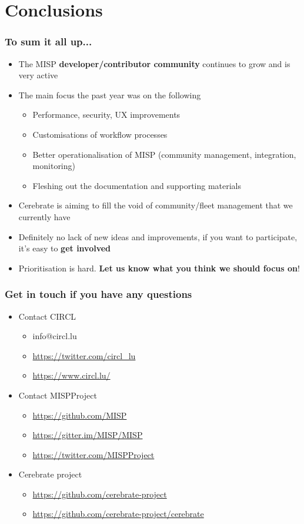 \section{Conclusions}

\begin{frame}
  \frametitle{To sum it all up...}
  \begin{itemize}
     \item The MISP {\bf developer/contributor community} continues to grow and is very active
     \item The main focus the past year was on the following
     \begin{itemize}
          \item Performance, security, UX improvements
          \item Customisations of workflow processes
          \item Better operationalisation of MISP (community management, integration, monitoring)
          \item Fleshing out the documentation and supporting materials
     \end{itemize}
     \item Cerebrate is aiming to fill the void of community/fleet management that we currently have
     \item Definitely no lack of new ideas and improvements, if you want to participate, it's easy to {\bf get involved}
     \item Prioritisation is hard. {\bf Let us know what you think we should focus on}!
  \end{itemize}
\end{frame}

\begin{frame}
  \frametitle{Get in touch if you have any questions}
  \begin{itemize}
    \item Contact CIRCL
    \begin{itemize}
      \item info@circl.lu
      \item \url{https://twitter.com/circl_lu}
      \item \url{https://www.circl.lu/}
    \end{itemize}
    \item Contact MISPProject 
    \begin{itemize}
      \item \url{https://github.com/MISP}
      \item \url{https://gitter.im/MISP/MISP}
      \item \url{https://twitter.com/MISPProject}
    \end{itemize}
    \item Cerebrate project
    \begin{itemize}
      \item \url{https://github.com/cerebrate-project}
      \item \url{https://github.com/cerebrate-project/cerebrate}
    \end{itemize}
  \end{itemize}
\end{frame}
